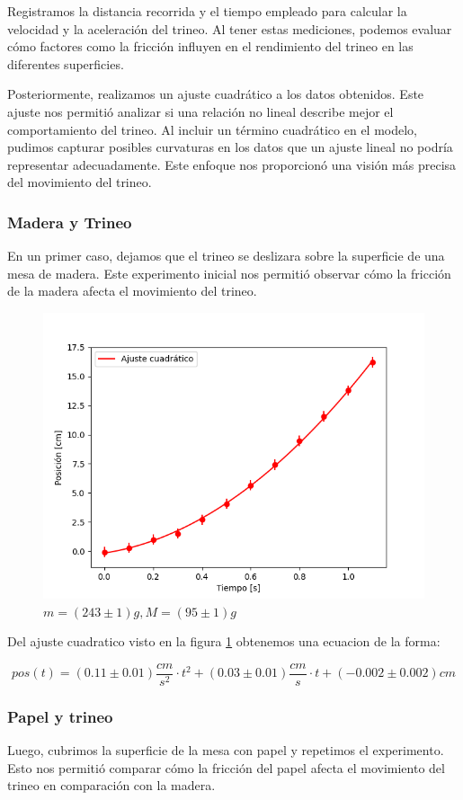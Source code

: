 \documentclass[12pt,a4]{article}
\begin{document}
Registramos la distancia recorrida y el tiempo empleado para calcular la velocidad y la aceleración del trineo. Al tener estas mediciones, podemos evaluar cómo factores como la
 fricción influyen en el rendimiento del trineo en las diferentes superficies.

Posteriormente, realizamos un ajuste cuadrático a los datos obtenidos. Este ajuste nos permitió analizar si una relación no lineal describe mejor el comportamiento del trineo.
 Al incluir un término cuadrático en el modelo, pudimos capturar posibles curvaturas en los datos que un ajuste lineal no podría representar adecuadamente. Este enfoque nos
  proporcionó una visión más precisa del movimiento del trineo.

\subsubsection*{Madera y Trineo}

En un primer caso, dejamos que el trineo se deslizara sobre la superficie de una mesa de madera. Este experimento inicial nos permitió observar cómo la fricción de la madera
 afecta el movimiento del trineo.\\

\begin{figure}[H]
    \centering
    \includegraphics[width=0.44\linewidth]{ajuste2_PisoMaderaMPB_O.png}
    \caption{$m = (243 \pm 1) g, M = (95 \pm 1) g$}
    \label{fig:M_OP piso trineo}
\end{figure}

Del ajuste cuadratico visto en la figura \ref{fig:M_OP piso trineo} obtenemos una ecuacion de la forma:

\[
pos(t) = (0.11 \pm 0.01) \frac{cm}{s^2} \cdot t^2 + (0.03 \pm 0.01) \frac{cm}{s} \cdot t + (-0.002 \pm 0.002) cm
\]

\subsubsection*{Papel y trineo}

Luego, cubrimos la superficie de la mesa con papel y repetimos el experimento. Esto nos permitió comparar cómo la fricción del papel afecta el movimiento del trineo en comparación con la madera.
\end{document}
